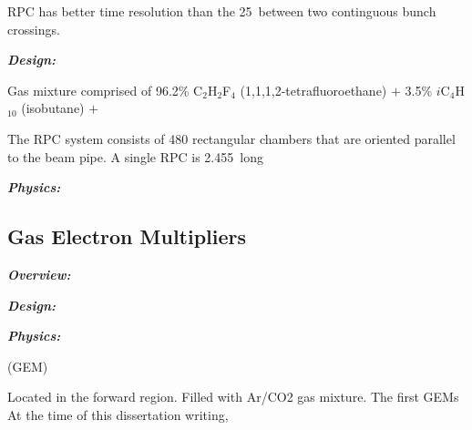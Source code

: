 RPC has better time resolution than the 25~\ns between two continguous \pp bunch crossings.

\textbf{\textit{Design:}}

Gas mixture comprised of 96.2\% C$_{2}$H$_{2}$F$_{4}$ (1,1,1,2-tetrafluoroethane) $+$ 3.5\% $i$C$_{4}$H$_10$ (isobutane) $+$ 

The RPC system consists of 480 rectangular chambers that are oriented parallel to the beam pipe.
A single RPC is 2.455~\mm long 


\textbf{\textit{Physics:}}

\subsection{Gas Electron Multipliers}
\label{sec:gem}

\textbf{\textit{Overview:}}

\textbf{\textit{Design:}}

\textbf{\textit{Physics:}}

(GEM)

Located in the forward region.
Filled with Ar/CO2 gas mixture.
The first GEMs At the time of this dissertation writing, 








